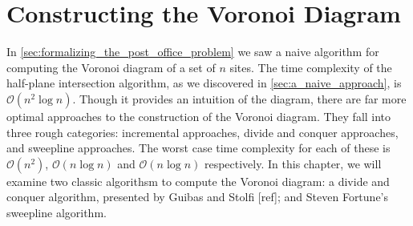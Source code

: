 \documentclass[12pt,twoside]{reedthesis}
\begin{document}

  \chapter*{Constructing the Voronoi Diagram}
    \setcounter{chapter}{3}
    \setcounter{section}{0}
    In \cref{sec:formalizing_the_post_office_problem} we saw a naive algorithm for computing the Voronoi diagram of a set of $n$ sites. The time complexity of the half-plane intersection algorithm, as we discovered in \cref{sec:a_naive_approach}, is $\mathcal{O}(n^{2}\log n)$. Though it provides an intuition of the diagram, there are far more optimal approaches to the construction of the Voronoi diagram. They fall into three rough categories: incremental approaches, divide and conquer approaches, and sweepline approaches. The worst case time complexity for each of these is $\mathcal{O}(n^{2})$, $\mathcal{O}(n\log n)$ and $\mathcal{O}(n\log n)$ respectively. In this chapter, we will examine two classic algorithsm to compute the Voronoi diagram: a divide and conquer algorithm, presented by Guibas and Stolfi [ref]; and Steven Fortune's sweepline algorithm. \par
    
\end{document}
